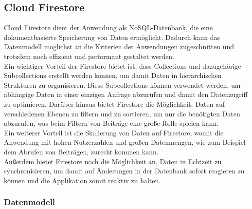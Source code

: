 \subsection{Cloud Firestore}
Cloud Firestore dient der Anwendung als NoSQL-Datenbank, die eine dokumentbasierte Speicherung von Daten ermöglicht. Dadurch kann das Datenmodell möglichst an die Kriterien der Anwendungen zugeschnitten und trotzdem noch effizient und performant gestaltet werden.
\\
Ein wichtiger Vorteil der Firestore bietet ist, dass Collections und dazugehörige Subcollections erstellt werden können, um damit Daten in hierarchischen Strukturen zu organisieren. Diese Subcollections können verwendet werden, um abhängige Daten in einer einzigen Anfrage abzurufen und damit den Datenzugriff zu optimieren. Darüber hinaus bietet Firestore die Möglichkeit, Daten auf verschiedenen Ebenen zu filtern und zu sortieren, um nur die benötigten Daten abzurufen, was beim Filtern von Beiträge eine große Rolle spielen kann.
\\
Ein weiterer Vorteil ist die Skalierung von Daten auf Firestore, womit die Anwendung mit hohen Nutzerzahlen und großen Datenmengen, wie zum Beispiel dem Abrufen von Beiträgen, zurecht kommen kann.
\\
Außerdem bietet Firestore noch die Möglichkeit an, Daten in Echtzeit zu synchronisieren, um damit auf Änderungen in der Datenbank sofort reagieren zu können und die Applikation somit reaktiv zu halten.


\subsubsection{Datenmodell}

